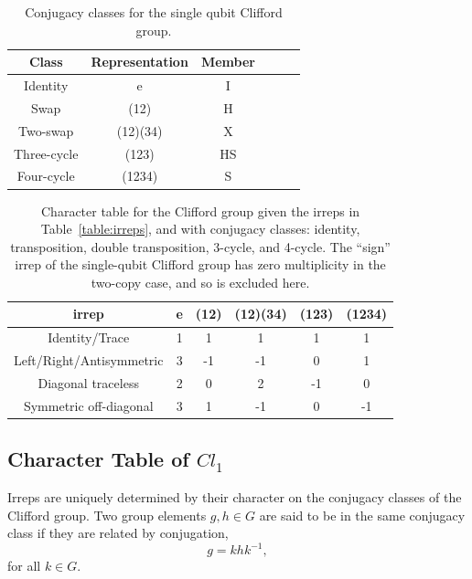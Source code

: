 \begin{table}[]
    \centering
    \begin{tabular}{c|c|c|c|c|c}
         Class & Representation & Member \\
         \hline
         Identity &e&I \\
         \hline
         Swap &(12)&H\\
         \hline
         Two-swap &(12)(34)&X\\
         \hline
         Three-cycle &(123)&HS\\
         \hline
         Four-cycle &(1234)&S\\
    \end{tabular}
    \caption{Conjugacy classes for the single qubit Clifford group.}
    \label{table:conj}
\end{table}
\begin{table}[]
    \centering
    \begin{tabular}{c|c|c|c|c|c}
         irrep & e & (12) & (12)(34) & (123) & (1234)\\
         \hline
         Identity/Trace &1&1&1&1&1 \\
         \hline
         Left/Right/Antisymmetric &3&-1&-1&0&1 \\
         \hline
         Diagonal traceless &2&0&2&-1&0 \\
         \hline
         Symmetric off-diagonal &3&1&-1&0&-1 \\
    \end{tabular}
    \caption{Character table for the Clifford group given the irreps in Table~\ref{table:irreps}, and with conjugacy classes: identity, transposition, double transposition, 3-cycle, and 4-cycle. The ``sign'' irrep of the single-qubit Clifford group has zero multiplicity in the two-copy case, and so is excluded here.}
    \label{table:character}
\end{table}

\subsection{Character Table of $Cl_1$}
\label{app:char_table}
Irreps are uniquely determined by their character on the conjugacy classes of the Clifford group. 
Two group elements $g,h\in G$ are said to be in the same conjugacy class if they are related by conjugation,
\begin{equation}
g = khk^{-1},
\end{equation}
for all $k\in G$.

